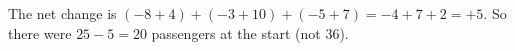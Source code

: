 The net change is $(-8+4)+(-3+10)+(-5+7)=-4+7+2=+5$. So there were $25-5=\boxed{20}$ passengers at the start (not $36$).
